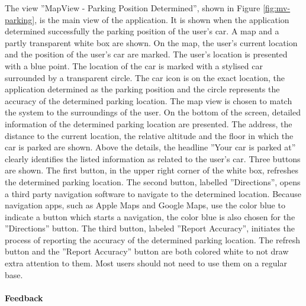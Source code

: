 The view ''MapView - Parking Position Determined'', shown in Figure \ref{fig:mv-parking}, is the main view of the application. It is shown when the application determined successfully the parking position of the user's car. A map and a partly transparent white box are shown. On the map, the user's current location and the position of the user's car are marked. The user's location is presented with a blue point. The location of the car is marked with a stylised car surrounded by a transparent circle. The car icon is on the exact location, the application determined as the parking position and the circle represents the accuracy of the determined parking location. The map view is chosen to match the system to the surroundings of the user. On the bottom of the screen, detailed information of the determined parking location are presented. The address, the distance to the current location, the relative altitude and the floor in which the car is parked are shown. Above the details, the headline ''Your car is parked at'' clearly identifies the listed information as related to the user's car. Three buttons are shown. The first button, in the upper right corner of the white box, refreshes the determined parking location. The second button, labelled ''Directions'', opens a third party navigation software to navigate to the determined location. Because navigation apps, such as Apple Maps and Google Maps, use the color blue to indicate a button which starts a navigation, the color blue is also chosen for the ''Directions'' button. The third button, labeled ''Report Accuracy'', initiates the process of reporting the accuracy of the determined parking location. The refresh button and the ''Report Accuracy'' button are both colored white to not draw extra attention to them. Most users should not need to use them on a regular base. \cite{nielsen1994usability}

\paragraph{Feedback}

